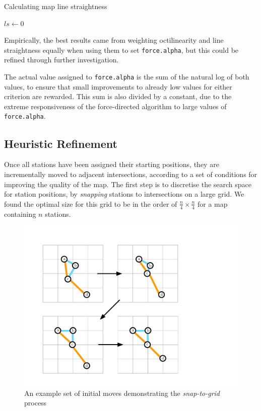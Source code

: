 \begin{algorithm}
\label{alg:ls}
 \caption{Calculating map line straightness}
 $ls \gets 0$ \;
\end{algorithm}

Empirically, the best results came from weighting octilinearity and line straightness equally when using them to set \texttt{force.alpha}, but this could be refined through further investigation. 

The actual value assigned to \texttt{force.alpha} is the sum of the natural log of both values, to ensure that small improvements to already low values for either criterion are rewarded. This sum is also divided by a constant, due to the extreme responsiveness of the force-directed algorithm to large values of \texttt{force.alpha}.

\subsection{Heuristic Refinement}

Once all stations have been assigned their starting positions, they are incrementally moved to adjacent intersections, according to a set of conditions for improving the quality of the map. The first step is to discretise the search space for station positions, by \textit{snapping} stations to intersections on a large grid. We found the optimal size for this grid to be in the order of $\frac{n}{4}\times\frac{n}{4}$ for a map containing $n$ stations.

\begin{figure}[htbp!]
	\centering
	\includegraphics[width=.7\textwidth]{img/implementation/snap.pdf}
	\caption{An example set of initial moves demonstrating the \textit{snap-to-grid} process}
	\label{fig:snap}
\end{figure}

